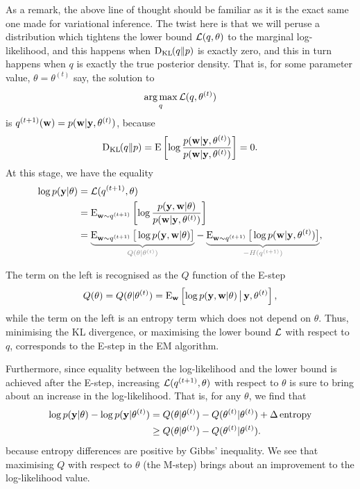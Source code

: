 As a remark, the above line of thought should be familiar as it is the exact same one made for variational inference.
The twist here is that we will peruse a distribution which tightens the lower bound ${\mathcal L}(q,\theta)$ to the marginal log-likelihood, and this happens when $\operatorname{D_{KL}\hspace{-1pt}}(q\Vert p)$ is exactly zero, and this in turn happens when $q$ is exactly the true posterior density.
That is, for some parameter value, $\theta = \theta^{(t)}$ say, the solution to
\begin{equation}
  \operatorname*{arg\,max}_q {\mathcal L}(q,\theta^{(t)})
\end{equation}
is $q^{(t+1)}({\mathbf w}) = p({\mathbf w}|{\mathbf y},\theta^{(t)})$, because
\begin{align*}
  \operatorname{D_{KL}\hspace{-1pt}}(q \Vert p) = \operatorname{E} \left[\log \frac{p({\mathbf w}|{\mathbf y},\theta^{(t)})}{p({\mathbf w}|{\mathbf y},\theta^{(t)})} \right] = 0.
\end{align*}
At this stage, we have the equality
\begin{align}
  \log p(\by|\theta) 
  &= \cL(q^{(t+1)},\theta) \\
  &= \E_{\bw\sim q^{(t+1)}} \left[\log \frac{p(\by,\bw|\theta)}{p(\bw|\by,\theta^{(t)})}  \right]  \\
  &= \myunderbrace{\E_{\bw\sim q^{(t+1)}} \big[\log p(\by,\bw|\theta)  \big]}{Q(\theta|\theta^{(t)})}
  - \myunderbrace{\E_{\bw\sim q^{(t+1)}} \big[\log p(\bw|\by,\theta^{(t)})\big]}{-H(q^{(t+1)})},
\end{align}

The term on the left is recognised as the $Q$ function of the E-step
\[
  Q(\theta) = Q(\theta|\theta^{(t)}) = \operatorname{E}_{\mathbf w}\left[ \log p({\mathbf y},{\mathbf w}|\theta) \,\big|\, {\mathbf y},\theta^{(t)} \right],
\]
while the term on the left is an entropy term which does not depend on $\theta$.
Thus, minimising the KL divergence, or maximising the lower bound ${\mathcal L}$ with respect to $q$, corresponds to the E-step in the EM algorithm.

Furthermore, since equality between the log-likelihood and the lower bound is achieved after the E-step, increasing ${\mathcal L}(q^{(t+1)},\theta)$ with respect to $\theta$ is sure to bring about an increase in the log-likelihood.
That is, for any $\theta$, we find that
\begin{align*}
  \log p({\mathbf y}|\theta) - \log p({\mathbf y}|\theta^{(t)}) 
  &= Q(\theta|\theta^{(t)}) - Q(\theta^{(t)}|\theta^{(t)}) + \Delta \, \text{entropy} \\
  &\geq Q(\theta|\theta^{(t)}) - Q(\theta^{(t)}|\theta^{(t)}).
\end{align*}
because entropy differences are positive by Gibbs' inequality.
We see that maximising $Q$ with respect to $\theta$ (the M-step) brings about an improvement to the log-likelihood value.

